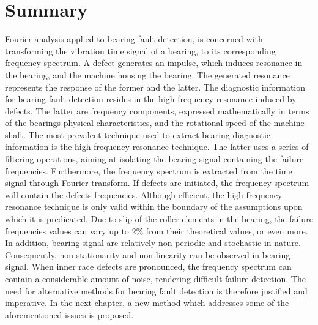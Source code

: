 \documentclass[../Main/thesis.tex]{subfiles}
\begin{document}
\clearpage
\section{Summary}
\label{sec:chapter_conclusion}
Fourier analysis applied to bearing fault detection, is concerned with transforming the vibration time signal of a bearing, to its corresponding frequency spectrum. A defect generates an impulse, which induces resonance in the bearing, and the machine housing the bearing. The generated resonance represents the response of the former and the latter.
\justify
The diagnostic information for bearing fault detection resides in the high frequency resonance induced by defects. The latter are frequency components, expressed mathematically in terms of the bearings physical characteristics, and the rotational speed of the machine shaft. The most prevalent technique used to extract bearing diagnostic information is the high frequency resonance technique.
\justify
The latter uses a series of filtering operations, aiming at isolating the bearing signal containing the failure frequencies. Furthermore, the frequency spectrum is extracted from the time signal through Fourier transform. If defects are initiated, the frequency spectrum will contain the defects frequencies. Although efficient, the high frequency resonance technique is only valid within the boundary of the assumptions upon which it is predicated. 
\justify
Due to slip of the roller elements in the bearing, the failure frequencies values can vary up to 2$\%$ from their theoretical values, or even more. In addition, bearing signal are relatively non periodic and stochastic in nature. Consequently, non-stationarity and non-linearity can be observed in bearing signal. When inner race defects are pronounced, the frequency spectrum can contain a considerable amount of noise, rendering difficult failure detection. The need for alternative methods for bearing fault detection is therefore justified and imperative. In the next chapter, a new method which addresses some of the aforementioned issues is proposed.



















\blankpage
\end{document}

